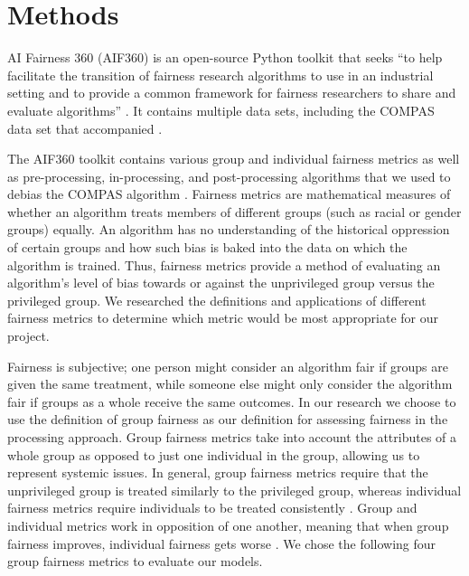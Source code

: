 \documentclass[water,article,submit,moreauthors,pdftex]{mdpi}
\begin{document}
\hypertarget{methods}{%
\section{Methods}\label{methods}}

AI Fairness 360 (AIF360) is an open-source Python toolkit that seeks
``to help facilitate the transition of fairness research algorithms to
use in an industrial setting and to provide a common framework for
fairness researchers to share and evaluate algorithms''
\citep{aif360-oct-2018}. It contains multiple data sets, including the
COMPAS data set that accompanied \citet{angwin2016machine}.

The AIF360 toolkit contains various group and individual fairness
metrics as well as pre-processing, in-processing, and post-processing
algorithms that we used to debias the COMPAS algorithm
\citep{aif360-oct-2018}. Fairness metrics are mathematical measures of
whether an algorithm treats members of different groups (such as racial
or gender groups) equally. An algorithm has no understanding of the
historical oppression of certain groups and how such bias is baked into
the data on which the algorithm is trained. Thus, fairness metrics
provide a method of evaluating an algorithm's level of bias towards or
against the unprivileged group versus the privileged group. We
researched the definitions and applications of different fairness
metrics \citep{ashokan2021fairness} to determine which metric would be
most appropriate for our project.

Fairness is subjective; one person might consider an algorithm fair if
groups are given the same treatment, while someone else might only
consider the algorithm fair if groups as a whole receive the same
outcomes. In our research we choose to use the definition of group
fairness as our definition for assessing fairness in the processing
approach. Group fairness metrics take into account the attributes of a
whole group as opposed to just one individual in the group, allowing us
to represent systemic issues. In general, group fairness metrics require
that the unprivileged group is treated similarly to the privileged
group, whereas individual fairness metrics require individuals to be
treated consistently \citep{kypraiou_what_2021}. Group and individual
metrics work in opposition of one another, meaning that when group
fairness improves, individual fairness gets worse
\citep{kypraiou_what_2021}. We chose the following four group fairness
metrics to evaluate our models.
\end{document}
